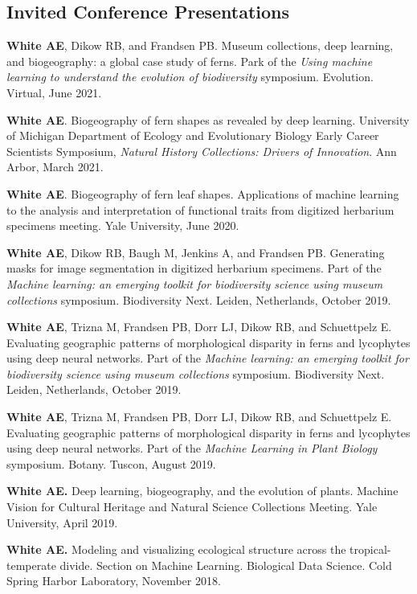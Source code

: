 \documentclass[letterpaper]{article}
\newenvironment{biblist}{%
   \begin{list}{}{%
     \setlength{\labelwidth}{0pt}%
     \setlength{\labelsep}{1em}%
     \setlength{\leftmargin}{2em}%
     \setlength{\itemindent}{-1em}%
   }
}{\end{list}}
\begin{document}
\subsection*{Invited Conference Presentations}
\begin{biblist}
\item \textbf{White AE}, Dikow RB, and Frandsen PB. Museum collections, deep learning, and biogeography: a global case study of ferns. Park of the \textit{Using machine learning to understand the evolution of biodiversity} symposium. Evolution. Virtual, June 2021.

\item \textbf{White AE}. Biogeography of fern shapes as revealed by deep learning. University of Michigan Department of Ecology and Evolutionary Biology Early Career Scientists Symposium, \textit{Natural History Collections: Drivers of Innovation}. Ann Arbor, March 2021.

\item \textbf{White AE}. Biogeography of fern leaf shapes. Applications of machine learning to the analysis and interpretation of functional traits from digitized herbarium specimens meeting. Yale University, June 2020.

\item \textbf{White AE}, Dikow RB, Baugh M, Jenkins A, and Frandsen PB. Generating masks for image segmentation in digitized herbarium specimens. Part of the \textit{Machine learning: an emerging toolkit for biodiversity science using museum collections} symposium. Biodiversity Next. Leiden, Netherlands, October 2019.

\item \textbf{White AE}, Trizna M, Frandsen PB, Dorr LJ, Dikow RB, and Schuettpelz E. Evaluating geographic patterns of morphological disparity in ferns and lycophytes using deep neural networks. Part of the \textit{Machine learning: an emerging toolkit for biodiversity science using museum collections} symposium. Biodiversity Next. Leiden, Netherlands, October 2019.

\item \textbf{White AE}, Trizna M, Frandsen PB, Dorr LJ, Dikow RB, and Schuettpelz E. Evaluating geographic patterns of morphological disparity in ferns and lycophytes using deep neural networks. Part of the \textit{Machine Learning in Plant Biology} symposium. Botany. Tuscon, August 2019.

\item \textbf{White AE.} Deep learning, biogeography, and the evolution of plants. Machine Vision for Cultural Heritage and Natural Science Collections Meeting. Yale University, April 2019.

\item \textbf{White AE.} Modeling and visualizing ecological structure across the tropical- temperate divide. Section on Machine Learning. Biological Data Science. Cold Spring Harbor Laboratory, November 2018.
\end{biblist}
\end{document}
